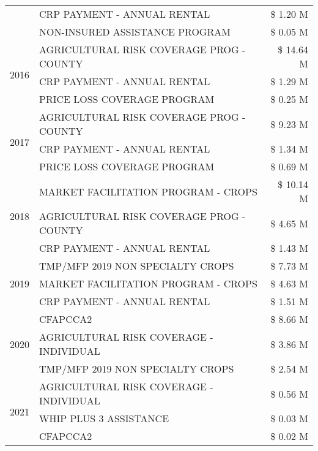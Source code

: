 \begin{tabular}{llr}
 & CRP PAYMENT - ANNUAL RENTAL & \$ 1.20 M \\
 & NON-INSURED ASSISTANCE PROGRAM & \$ 0.05 M \\
\cline{1-3}
\multirow[t]{3}{*}{2016} & AGRICULTURAL RISK COVERAGE PROG - COUNTY & \$ 14.64 M \\
 & CRP PAYMENT - ANNUAL RENTAL & \$ 1.29 M \\
 & PRICE LOSS COVERAGE PROGRAM & \$ 0.25 M \\
\cline{1-3}
\multirow[t]{3}{*}{2017} & AGRICULTURAL RISK COVERAGE PROG - COUNTY & \$ 9.23 M \\
 & CRP PAYMENT - ANNUAL RENTAL & \$ 1.34 M \\
 & PRICE LOSS COVERAGE PROGRAM & \$ 0.69 M \\
\cline{1-3}
\multirow[t]{3}{*}{2018} & MARKET FACILITATION PROGRAM - CROPS & \$ 10.14 M \\
 & AGRICULTURAL RISK COVERAGE PROG - COUNTY & \$ 4.65 M \\
 & CRP PAYMENT - ANNUAL RENTAL & \$ 1.43 M \\
\cline{1-3}
\multirow[t]{3}{*}{2019} & TMP/MFP 2019 NON SPECIALTY CROPS & \$ 7.73 M \\
 & MARKET FACILITATION PROGRAM - CROPS & \$ 4.63 M \\
 & CRP PAYMENT - ANNUAL RENTAL & \$ 1.51 M \\
\cline{1-3}
\multirow[t]{3}{*}{2020} & CFAPCCA2 & \$ 8.66 M \\
 & AGRICULTURAL RISK COVERAGE - INDIVIDUAL & \$ 3.86 M \\
 & TMP/MFP 2019 NON SPECIALTY CROPS & \$ 2.54 M \\
\cline{1-3}
\multirow[t]{3}{*}{2021} & AGRICULTURAL RISK COVERAGE - INDIVIDUAL & \$ 0.56 M \\
 & WHIP PLUS 3 ASSISTANCE & \$ 0.03 M \\
 & CFAPCCA2 & \$ 0.02 M \\
\cline{1-3}
\bottomrule
\end{tabular}
